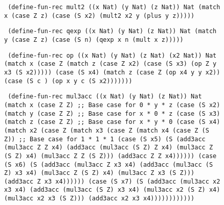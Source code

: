 \begin{figure}
  \texttt{
    (define-fun-rec mult2 ((x Nat) (y Nat) (z Nat)) Nat
      (match x
        (case Z      z)
        (case (S x2) (mult2 x2 y (plus y z)))))
  }

  \texttt{
    (define-fun-rec qexp ((x Nat) (y Nat) (z Nat)) Nat
      (match y
        (case Z     z)
        (case (S n) (qexp x n (mult x z)))))
  }

  \texttt{
    (define-fun-rec op ((x Nat) (y Nat) (z Nat) (x2 Nat)) Nat
      (match x
        (case Z
          (match z
            (case Z      x2)
            (case (S x3) (op Z  y x3 (S x2)))))
        (case (S x4)
          (match z
            (case Z      (op x4 y y  x2))
            (case (S c ) (op x  y c  (S x2)))))))
  }

  \texttt{
    (define-fun-rec mul3acc ((x Nat) (y Nat) (z Nat)) Nat
      (match x
        (case Z Z)                          ;; Base case for 0 * y * z
        (case (S x2)
          (match y
            (case Z Z)                      ;; Base case for x * 0 * z
            (case (S x3)
              (match z
                (case Z Z)                  ;; Base case for x * y * 0
                (case (S x4)
                  (match x2
                    (case Z
                      (match x3
                        (case Z
                          (match x4
                            (case Z (S Z))  ;; Base case for 1 * 1 * 1
                            (case (S x5)
                              (S (add3acc (mul3acc Z Z x4)
                                          (add3acc (mul3acc (S Z) Z x4)
                                                   (mul3acc Z (S Z) x4)
                                                   (mul3acc Z Z (S Z)))
                                          (add3acc Z Z x4))))))
                        (case (S x6)
                          (S (add3acc (mul3acc Z x3 x4)
                                      (add3acc (mul3acc (S Z) x3 x4)
                                               (mul3acc Z (S Z) x4)
                                               (mul3acc Z x3 (S Z)))
                                      (add3acc Z x3 x4))))))
                    (case (S x7)
                      (S (add3acc (mul3acc x2 x3 x4)
                                  (add3acc (mul3acc (S Z) x3 x4)
                                           (mul3acc x2 (S Z) x4)
                                           (mul3acc x2 x3 (S Z)))
                                  (add3acc x2 x3 x4))))))))))))
  }


\end{figure}
